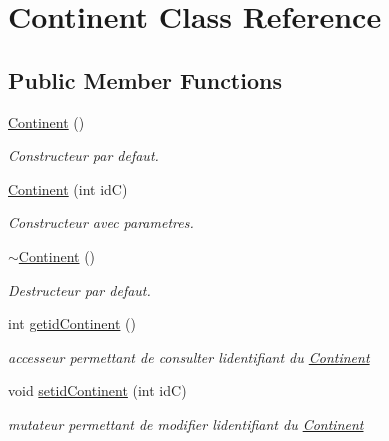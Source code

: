 \hypertarget{classContinent}{}\section{Continent Class Reference}
\label{classContinent}
\subsection*{Public Member Functions}
\begin{DoxyCompactItemize}
\item 
\mbox{\label{classContinent_ae2bd322d891547d02ecfd28c29be3fec}} 
\mbox{\hyperlink{classContinent_ae2bd322d891547d02ecfd28c29be3fec}{Continent}} ()
\begin{DoxyCompactList}\small\item\em Constructeur par defaut. \end{DoxyCompactList}\item 
\mbox{\hyperlink{classContinent_aabc05191c73b118cd14f2eb71436962c}{Continent}} (int idC)
\begin{DoxyCompactList}\small\item\em Constructeur avec parametres. \end{DoxyCompactList}\item 
\mbox{\label{classContinent_ad739b69164aef551dace8b8bafe73a64}} 
\mbox{\hyperlink{classContinent_ad739b69164aef551dace8b8bafe73a64}{$\sim$\+Continent}} ()
\begin{DoxyCompactList}\small\item\em Destructeur par defaut. \end{DoxyCompactList}\item 
int \mbox{\hyperlink{classContinent_ae3cfd254894dfd0f43f6804c257bf2f4}{getid\+Continent}} ()
\begin{DoxyCompactList}\small\item\em accesseur permettant de consulter l\textquotesingle{}identifiant du \mbox{\hyperlink{classContinent}{Continent}} \end{DoxyCompactList}\item 
void \mbox{\hyperlink{classContinent_a18597ac399b96c6e8b31a2e26f202a74}{setid\+Continent}} (int idC)
\begin{DoxyCompactList}\small\item\em mutateur permettant de modifier l\textquotesingle{}identifiant du \mbox{\hyperlink{classContinent}{Continent}} \end{DoxyCompactList}\item 

\end{DoxyCompactItemize}
